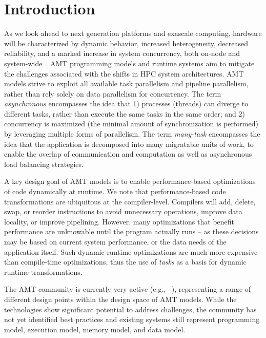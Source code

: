 \chapter{Introduction}
\label{chap:introduction}
As we look ahead to next generation platforms and exascale computing,  hardware 
will be characterized by dynamic behavior, increased
heterogeneity, decreased reliability, and a marked increase in system
\gls{concurrency}, both on-node and system-wide~\cite{doe_arch, dav_exascale}. 
\gls{AMT} \glspl{programming model} and \glspl{runtime system} 
aim to mitigate the challenges associated with the shifts in \gls{HPC} system architectures.  
\gls{AMT} models strive to exploit all available \gls{task parallelism} and
\gls{pipeline parallelism}, rather than rely solely on \gls{data parallelism}
for \gls{concurrency}. The term {\em \gls{asynchronous}} encompasses the idea that 
1) processes (threads) can diverge to different tasks, rather than execute 
the same tasks in the same order; and 2) \gls{concurrency} is maximized (the 
  minimal amount of synchronization is performed) by 
leveraging multiple forms of parallelism. The term {\em many-task} encompasses 
the idea that the application is decomposed into many 
\gls{migratable} units of work, to enable the overlap of communication and 
computation as well as asynchronous load balancing strategies.

A key design goal of \gls{AMT} models is to enable performance-based
optimizations of code dynamically at runtime.
We note that performance-based code transformations are ubiquitous at the compiler-level.
Compilers will add, delete, swap, or reorder instructions to avoid unnecessary operations, improve data locality, or improve pipelining.
However, many optimizations that benefit performance are unknowable until the program
actually runs -- as these decisions may be based on current system performance,
or the data needs of the application itself. Such dynamic runtime optimizations are much more expensive 
than compile-time optimizations, thus the use of \emph{tasks} as a basis
for dynamic runtime transformations.

The \gls{AMT} community is currently very active (e.g.,
~\cite{OCR,STAPL,Legion,Realm,StencilHPX,Charm++,Uintah,Loci,PARSEC,DaGuE,Cilk}),
representing a range of different design points within the
design space of \gls{AMT} models. While the technologies show significant
potential to address challenges, the community has not yet identified best
practices and existing systems still represent \gls{programming model},
\gls{execution model}, \gls{memory model}, and \gls{data model}.  

